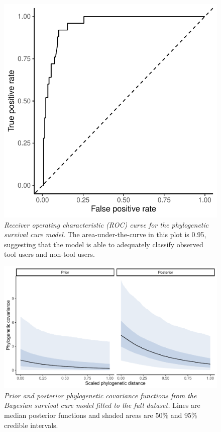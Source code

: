 \documentclass[
  man,floatsintext]{apa6}
\begin{document}
\begin{figure}
\centering
\includegraphics{manuscript_files/figure-latex/plotSurvCure9-1.pdf}
\caption{\label{fig:plotSurvCure9}\emph{Receiver operating characteristic (ROC) curve for the phylogenetic survival cure model.} The area-under-the-curve in this plot is 0.95, suggesting that the model is able to adequately classify observed tool users and non-tool users.}
\end{figure}

\newpage



\begin{figure}
\centering
\includegraphics{manuscript_files/figure-latex/plotSurvCure5-1.pdf}
\caption{\label{fig:plotSurvCure5}\emph{Prior and posterior phylogenetic covariance functions from the Bayesian survival cure model fitted to the full dataset.} Lines are median posterior functions and shaded areas are 50\% and 95\% credible intervals.}
\end{figure}
\end{document}
